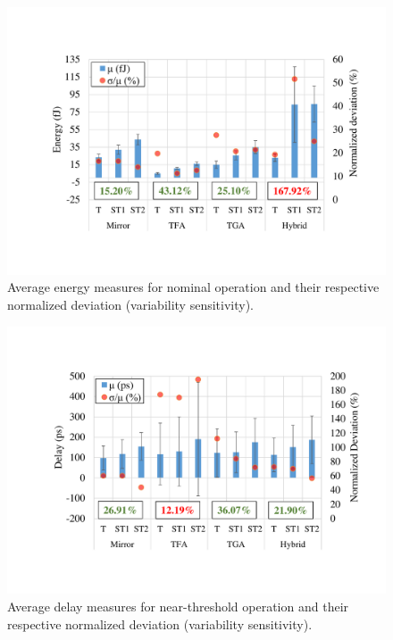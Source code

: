 \documentclass[pgmicro,mestrado,english]{iiufrgs}
\begin{document}
\begin{figure}[]
  \centering
    \includegraphics[width=\textwidth, trim={3.5cm 3cm 2cm 3.5cm}, clip]{averageEnergyNominal.pdf}
     \caption{Average energy measures for nominal operation and their respective normalized deviation (variability sensitivity).}
  \label{fig:avgEnergyNominal}
\end{figure}


\begin{figure}[]
  \centering
    \includegraphics[width=\textwidth, trim={3.5cm 3cm 2cm 3.5cm}, clip]{averageDelayNT.pdf}
     \caption{Average delay measures for near-threshold operation and their respective normalized deviation (variability sensitivity).}
  \label{fig:avgDelayNT}
\end{figure}
\end{document}
